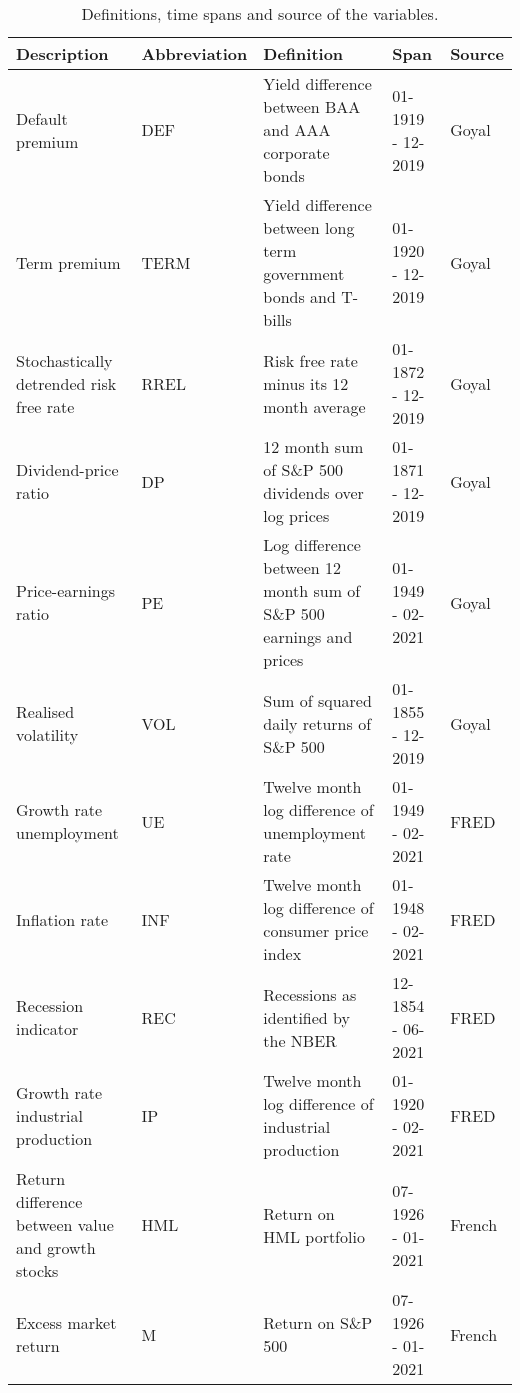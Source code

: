 \begin{table}[htbp]										
\centering									
\caption{Definitions, time spans and source of the variables.}\label{tab:data}										
\begin{tabulary}{\textwidth}{LLLLl}										
\toprule										
Description		&	Abbreviation	&	Definition	&	Span	&	Source	\\
\midrule										
Default premium		&	DEF	&	Yield difference between BAA and AAA corporate bonds	&	01-1919 - 12-2019	&	Goyal	\\
Term premium		&	TERM	&	Yield difference between long term government bonds and T-bills	&	01-1920 - 12-2019	&	Goyal	\\
Stochastically detrended risk free rate		&	RREL	&	Risk free rate minus its 12 month average	&	01-1872 - 12-2019	&	Goyal	\\
Dividend-price ratio		&	DP	&	12 month sum of S\&P 500 dividends over log prices	&	01-1871 - 12-2019	&	Goyal	\\
Price-earnings ratio		&	PE	&	Log difference between 12 month sum of S\&P 500 earnings and prices	&	01-1949 - 02-2021	&	Goyal	\\
Realised volatility		&	VOL	&	Sum of squared daily returns of S\&P 500	&	01-1855 - 12-2019	&	Goyal	\\
Growth rate unemployment		&	UE	&	Twelve month log difference of unemployment rate	&	01-1949 - 02-2021	&	FRED	\\
Inflation rate		&	INF	&	Twelve month log difference of consumer price index	&	01-1948 - 02-2021	&	FRED	\\
Recession indicator		&	REC	&	Recessions as identified by the NBER	&	12-1854 - 06-2021	&	FRED	\\
Growth rate industrial production		&	IP	&	Twelve month log difference of industrial production	&	01-1920 - 02-2021	&	FRED	\\
Return difference between value and growth stocks		&	HML	&	Return on HML portfolio	&	07-1926 - 01-2021	&	French	\\
Excess market return		&	M	&	Return on S\&P 500	&	07-1926 - 01-2021	&	French	\\
\bottomrule										
\end{tabulary}										
\end{table}										
